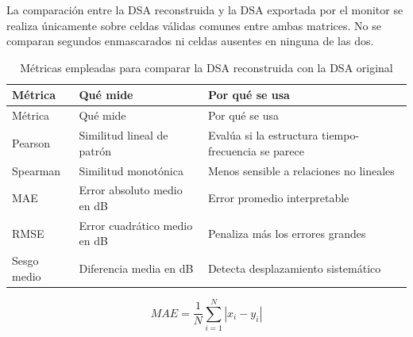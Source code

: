 \documentclass[
  spanish,
  a4paper,
  12pt,
  twoside]{memoir}
\begin{document}
La comparación entre la DSA reconstruida y la DSA exportada por el
monitor se realiza únicamente sobre celdas válidas comunes entre ambas
matrices. No se comparan segundos enmascarados ni celdas ausentes en
ninguna de las dos.

\begin{longtable}[]{@{}
  >{\raggedright\arraybackslash}p{}
  >{\raggedright\arraybackslash}p{}
  >{\raggedright\arraybackslash}p{}@{}}
\caption{Métricas empleadas para comparar la DSA reconstruida con la DSA
original}\label{tbl-metricas-comparacion}\tabularnewline
\toprule\noalign{}
\begin{minipage}[b]{\linewidth}\raggedright
Métrica
\end{minipage} & \begin{minipage}[b]{\linewidth}\raggedright
Qué mide
\end{minipage} & \begin{minipage}[b]{\linewidth}\raggedright
Por qué se usa
\end{minipage} \\
\midrule\noalign{}
\endfirsthead
\toprule\noalign{}
\begin{minipage}[b]{\linewidth}\raggedright
Métrica
\end{minipage} & \begin{minipage}[b]{\linewidth}\raggedright
Qué mide
\end{minipage} & \begin{minipage}[b]{\linewidth}\raggedright
Por qué se usa
\end{minipage} \\
\midrule\noalign{}
\endhead
\bottomrule\noalign{}
\endlastfoot
Pearson & Similitud lineal de patrón & Evalúa si la estructura
tiempo-frecuencia se parece \\
Spearman & Similitud monotónica & Menos sensible a relaciones no
lineales \\
MAE & Error absoluto medio en dB & Error promedio interpretable \\
RMSE & Error cuadrático medio en dB & Penaliza más los errores
grandes \\
Sesgo medio & Diferencia media en dB & Detecta desplazamiento
sistemático \\
\end{longtable}

\[MAE = \frac{1}{N}\sum_{i=1}^{N} |x_i - y_i|\]
\end{document}

